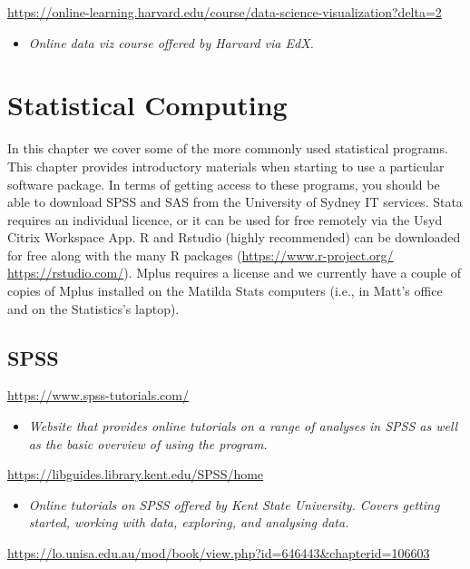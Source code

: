 \documentclass[
]{book}
\providecommand{\tightlist}{%
  \setlength{\itemsep}{0pt}\setlength{\parskip}{0pt}}
\begin{document}
\url{https://online-learning.harvard.edu/course/data-science-visualization?delta=2}

\begin{itemize}
\tightlist
\item
  \emph{Online data viz course offered by Harvard via EdX.}
\end{itemize}

\chapter{Statistical Computing}\label{statistical-computing}

In this chapter we cover some of the more commonly used statistical programs. This chapter provides introductory materials when starting to use a particular software package. In terms of getting access to these programs, you should be able to download SPSS and SAS from the University of Sydney IT services. Stata requires an individual licence, or it can be used for free remotely via the Usyd Citrix Workspace App. R and Rstudio (highly recommended) can be downloaded for free along with the many R packages (\url{https://www.r-project.org/} \url{https://rstudio.com/}). Mplus requires a license and we currently have a couple of copies of Mplus installed on the Matilda Stats computers (i.e., in Matt's office and on the Statistics's laptop).

\section{SPSS}\label{spss}

\url{https://www.spss-tutorials.com/}

\begin{itemize}
\tightlist
\item
  \emph{Website that provides online tutorials on a range of analyses in SPSS as well as the basic overview of using the program.}
\end{itemize}

\url{https://libguides.library.kent.edu/SPSS/home}

\begin{itemize}
\tightlist
\item
  \emph{Online tutorials on SPSS offered by Kent State University. Covers getting started, working with data, exploring, and analysing data.}
\end{itemize}

\url{https://lo.unisa.edu.au/mod/book/view.php?id=646443&chapterid=106603}
\end{document}
